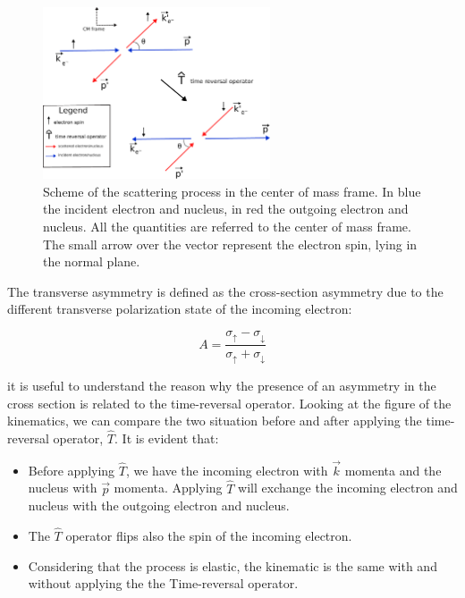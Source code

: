 \begin{figure}[hbtp] 
\centering
\includegraphics[width = 0.6\textwidth]{Transverse/scattering.pdf}
\caption{Scheme of the scattering process in the center of mass frame. In blue the incident electron and nucleus, in red the outgoing electron and nucleus. All the quantities are referred to the center of mass frame. The small arrow over the vector represent the electron spin, lying in the normal plane.}
\label{fig:ScatteringSchemeFinal}
\end{figure}

 The transverse asymmetry is defined as the cross-section asymmetry due to the different transverse polarization state of the incoming electron:

\begin{equation}
A = \frac{\sigma_{\uparrow} - \sigma_{\downarrow}}{\sigma_{\uparrow} + \sigma_{\downarrow}}
\end{equation}

it is useful to understand the reason why the presence of an asymmetry in the cross section is related to the time-reversal operator. Looking at the figure of the kinematics, we can compare the two situation before and after applying the time-reversal operator, $\hat{T}$. It is evident that: 

\begin{itemize}
\item Before applying $\hat{T}$, we have the incoming electron with $\vec{k}$ momenta and the nucleus with $\vec{p}$ momenta. Applying $\hat{T}$ will exchange the incoming electron and nucleus with the outgoing electron and nucleus.
\item The $\hat{T}$ operator flips also the spin of the incoming electron.
\item Considering that the process is elastic, the kinematic is the same with and without applying the the Time-reversal operator. 
\end{itemize}
 
